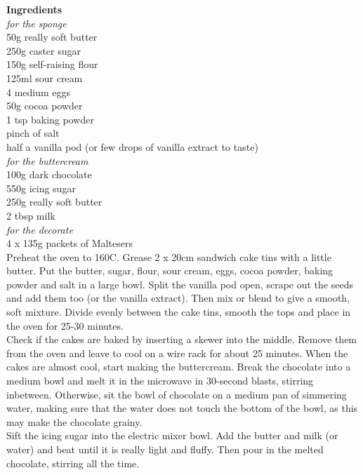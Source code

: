 \documentclass[18pt, oneside]{book}
\begin{document}
\textbf{Ingredients} \\ 
\textit{for the sponge} \\
50g really soft butter \\
250g caster sugar \\
150g self-raising flour \\
125ml sour cream \\
4 medium eggs \\
50g cocoa powder \\
1 tsp baking powder \\
pinch of salt \\
half a vanilla pod (or few drops of vanilla extract to taste) \\

\textit{for the buttercream} \\
100g dark chocolate \\
550g icing sugar \\
250g really soft butter \\
2 tbsp milk \\

\textit{for the decorate} \\
4 x 135g packets of Maltesers \\

Preheat the oven to 160C. Grease 2 x 20cm sandwich cake tins with a little butter. Put the butter, sugar, flour, sour cream, eggs, cocoa powder, baking powder and salt in a large bowl. Split the vanilla pod open, scrape out the seeds and add them too (or the vanilla extract). Then mix or blend to give a smooth, soft mixture. Divide evenly between the cake tins, smooth the tops and place in the oven for 25-30 minutes.\\

Check if the cakes are baked by inserting a skewer into the middle. Remove them from the oven and leave to cool on a wire rack for about 25 minutes. When the cakes are almost cool, start making the buttercream. Break the chocolate into a medium bowl and melt it in the microwave in 30-second blasts, stirring inbetween. Otherwise, sit the bowl of chocolate on a medium pan of simmering water, making sure that the water does not touch the bottom of the bowl, as this may make the chocolate grainy. \\

Sift the icing sugar into the electric mixer bowl. Add the butter and milk (or water) and beat until it is really light and fluffy.  Then pour in the melted chocolate, stirring all the time. 
\end{document}

